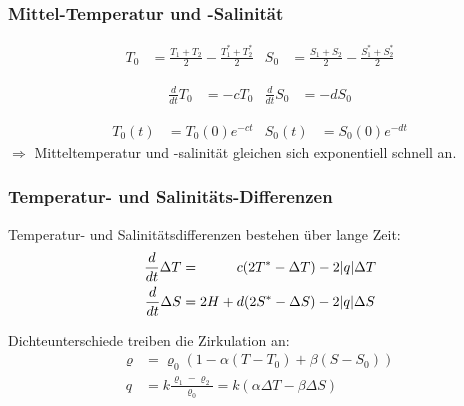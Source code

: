 %
%
\begin{frame}
\frametitle{Mittel-Temperatur und -Salinität}
\begin{anomalie}
\vspace{-10pt}
\begin{align*}
T_0
&=
\frac{T_1+T_2}{2} - \frac{T_1^*+T_2^*}{2}
&
S_0
&=
\frac{S_1+S_2}{2} - \frac{S_1^*+S_2^*}{2}
\end{align*}
\end{anomalie}
\begin{dgl}
\vspace{-10pt}
\begin{align*}
\frac{d}{dt} T_0 &= -cT_0
&
\frac{d}{dt} S_0 &= -dS_0
\end{align*}
\end{dgl}
\begin{lsg}
\vspace{-10pt}
\begin{align*}
T_0(t) &= T_0(0) e^{-ct}
&
S_0(t) &= S_0(0) e^{-dt}
\end{align*}
$\Rightarrow$
Mitteltemperatur und -salinität gleichen sich exponentiell schnell an.
\end{lsg}
\end{frame}

%
%
\begin{frame}
\frametitle{Temperatur- und Salinitäts-Differenzen}
\begin{dgl}
Temperatur- und Salinitätsdifferenzen bestehen über lange Zeit:
\begin{align*}
\frac{d}{dt}\Delta T
&=
\phantom{2H+\mathstrut}
c(2T^* - \Delta T) -2|q|\Delta T
\\
\frac{d}{dt}\Delta S
&=
2H + d(2S^* - \Delta S) - 2|q|\Delta S
\end{align*}
\end{dgl}
\begin{zust}
Dichteunterschiede treiben die Zirkulation an:
\begin{align*}
\varrho
&=
\varrho_0
(1-\alpha (T-T_0) + \beta(S-S_0))
\\
q
&=
k\frac{\varrho_1-\varrho_2}{\varrho_0}
=
k(\alpha\Delta T - \beta \Delta S)
\end{align*}
\end{zust}
\end{frame}

